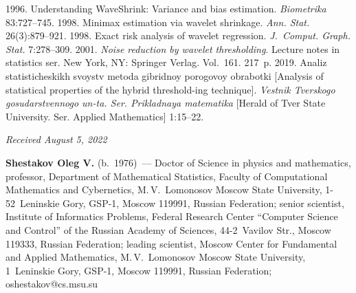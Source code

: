 \begin{multicols}{2}
{{\begin{thebibliography}{99}
 1996. Understanding WaveShrink: Variance and bias estimation. \textit{Biometrika} 83:727--745.
 1998. Minimax estimation via wavelet shrinkage. \textit{Ann. Stat.} 26(3):879--921.
 1998. Exact risk analysis of wavelet regression. 
\textit{J.~Comput. Graph. Stat.} 7:278--309.
 2001. \textit{Noise reduction by wavelet thresholding}. Lecture notes in statistics ser. New York, NY: Springer Verlag. Vol.~161. 217~p.
 2019. 
Analiz sta\-ti\-sti\-che\-skikh svoystv metoda gibridnoy porogovoy ob\-ra\-bot\-ki [Analysis of statistical properties of the hybrid threshold-ing technique]. 
\textit{Vestnik Tverskogo gosudarstvennogo un-ta. Ser. Prikladnaya matematika} [Herald of Tver State University. Ser. Applied Mathematics] 1:15--22.
 \end{thebibliography}

 }
 }

\end{multicols}

\vspace*{-6pt}

\hfill{\small\textit{Received August 5, 2022}}

\Contrl

\noindent
\textbf{Shestakov Oleg V.} (b.\ 1976)~--- 
Doctor of Science in physics and mathematics, professor, Department of Mathematical Statistics, Faculty of Computational Mathematics and Cybernetics, 
M.\,V.~Lomonosov Moscow State University, 1-52~Leninskie Gory, GSP-1, Moscow 119991, Russian Federation; 
senior scientist, Institute of Informatics Problems, Federal Research Center ``Computer Science and Control''
 of the Russian Academy of Sciences, 44-2~Vavilov Str., Moscow 119333, Russian Federation;
  leading scientist, Moscow Center for Fundamental and Applied Mathematics, M.\,V.~Lomonosov Moscow State University, 
  1~Leninskie Gory, GSP-1, Moscow 119991, Russian Federation; \mbox{oshestakov@cs.msu.su}


\label{end\stat}

\renewcommand{\bibname}{\protect\rm Литература}    
   